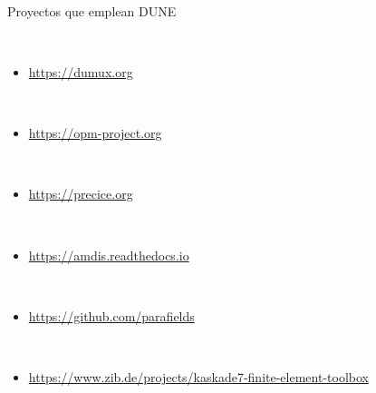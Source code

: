 \begin{frame}
	\frametitle{\secname}
	\framesubtitle{\subsecname}

	\begin{columns}
		\begin{column}{0.4\textwidth}
			\begin{alertblock}{Proyectos que emplean DUNE}

				\

				\begin{itemize}
					\item

					      \url{https://dumux.org}

					      \

					\item

					      \url{https://opm-project.org}

					      \

					\item

					      \url{https://precice.org}

					      \

					\item

					      \url{https://amdis.readthedocs.io}

					      \

					\item

					      \url{https://github.com/parafields}

					      \

					\item

					      \url{https://www.zib.de/projects/kaskade7-finite-element-toolbox}
				\end{itemize}
			\end{alertblock}
		\end{column}


\end{columns}
\end{frame}
